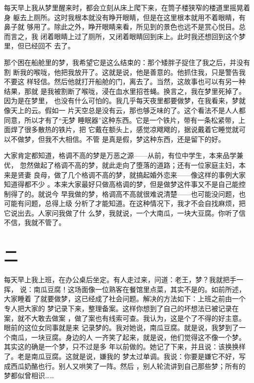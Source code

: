 每天早上我从梦里醒来时，都会立刻从床上爬下来，在筒子楼狭窄的楼道里摇晃着身
躯去上厕所。这时我根本就没有睁开眼睛，但是在这里根本就用不着眼睛，有鼻子就
够用了。除此之外，睁开眼睛来看，所见到的景色也远不是赏心悦目。总而言之，我
闭着眼睛上过了厕所，又闭着眼睛回到床上。此时我还想回到这个梦里，但已经回不
去了。

那个困在船舱里的梦，我希望它是这么结束的：那个矮胖子捉住了我之后，并没有割
断我的喉咙，他把我放开了。这就是说，他是善意的。他抓住我，只是警告我不要这
样轻信。然后他就打开船舱的门，离去了。当然，这故事也可以有另一种结果，那就
是我被割断了喉咙，浸在血水里招苍蝇。换言之，我在梦里死掉了。因为是在梦里，
也没有什么可怕的。我几乎每天夜里都要做梦，在我看来，梦就像天上的云。假如一
片天空总是没有云，那也够乏味的了。这个看法不是人人都同意，所以才有了“无梦
睡眠器”这种东西。它是一个铁片，带有一条松紧带，上面焊了很多散热的铁片，把
它戴在额头上，感觉凉飕飕的，据说戴着它睡觉就可以不做梦，但我不大相信。不管
是真是假，梦这种东西，还是留下的好。

大家肯定都知道，格调不高的梦是万恶之源——从前，有位中学生，本来品学兼优，
忽然做起了格调不高的梦，就此走向了堕落的道路；还有一位家庭主妇，本来是贤妻
良母，做了几个格调不高的梦，就搞起婚外恋来——像这样的事例大家知道得都不少
。本来大家最好只做高格调的梦，但是做梦这件事又不是自己能控制得了的。就说今
早我做的梦，格调高不高就很难说清楚——也可能没问题，也可能有问题，总得上级
分析了才能知道。在这种情况下，我才不会自找麻烦，把它说出去。人家问我做了什
么梦，我就说，一个大南瓜，一块大豆腐。你听了信不信，我就不管了。

\section{二}

每天早上我上班，在办公桌后坐定。有人走过来，问道：老王，梦？我就把手一挥，
说：南瓜豆腐！这场面像一位熟客在餐馆里点菜，其实不是的。如前所述，大家睡着
了就要做梦，这已经成了社会问题。解决的方法如下：上班之前由一个专人把大家的
梦记录下来，整理备案。这样你想到了自己的坏想法已被记录在案，就不大敢去做案
，做了案也有线索可查。我认为，这是个了不得的好主意。眼前的这位女同事就是来
记录梦的。我对她说，南瓜豆腐。就是说，我梦到了一个南瓜，一块豆腐。身边的人
一齐笑了起来，就是说，他们觉得这不像一个梦。其实这的确是一个梦，只不过是多
年以前做的。她记了下来，并且说：该换换样了。老是南瓜豆腐。这就是说，嫌我的
梦太过单调。我说：你要是嫌它不好，写成西瓜奶酪也行。别人又哄笑了一阵。然后
，别人轮流讲到自己那些梦；所有的梦都似曾相识……

